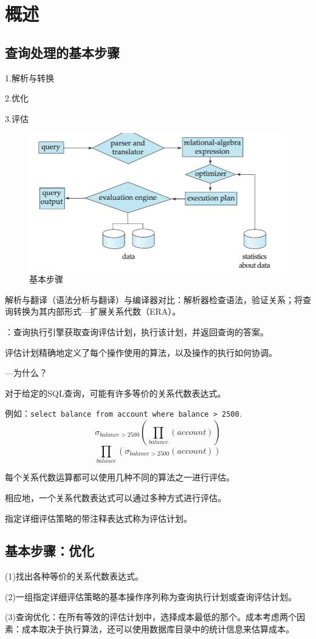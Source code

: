 \section{概述}

\subsection{查询处理的基本步骤}

1.解析与转换

2.优化

3.评估

\begin{figure}[H]
    \centering
    \includegraphics[width=0.8\linewidth]{image1.png}
    \caption{基本步骤}
    \label{}
\end{figure}

解析与翻译（语法分析与翻译）与编译器对比：解析器检查语法，验证关系；将查询转换为其内部形式---扩展关系代数（ERA）。

：查询执行引擎获取查询评估计划，执行该计划，并返回查询的答案。

评估计划精确地定义了每个操作使用的算法，以及操作的执行如何协调。

---为什么？

对于给定的SQL查询，可能有许多等价的关系代数表达式。

例如：\texttt{select balance from account where balance > 2500}.
$$\sigma_{balance>2500}(\prod_{balance}(account))$$
$$\prod_{balance}(\sigma_{balance>2500}(account))$$

每个关系代数运算都可以使用几种不同的算法之一进行评估。

相应地，一个关系代数表达式可以通过多种方式进行评估。

指定详细评估策略的带注释表达式称为评估计划。

\subsection{基本步骤：优化}

(1)找出各种等价的关系代数表达式。

(2)一组指定详细评估策略的基本操作序列称为查询执行计划或查询评估计划。

(3)查询优化：在所有等效的评估计划中，选择成本最低的那个。成本考虑两个因素：成本取决于执行算法，还可以使用数据库目录中的统计信息来估算成本。